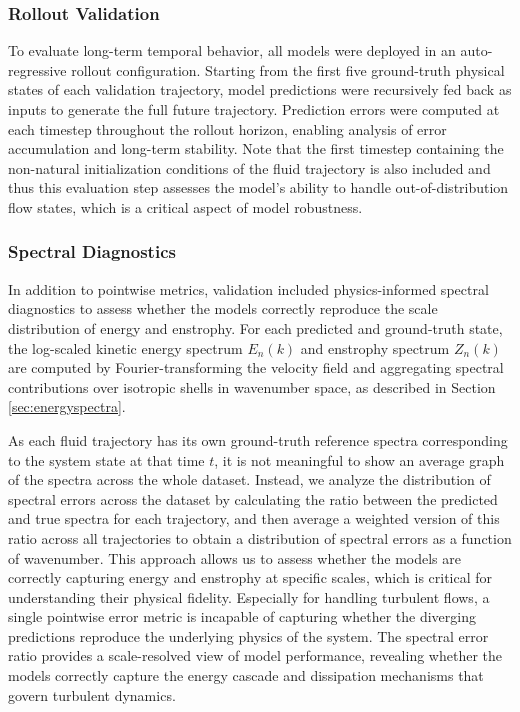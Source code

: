\subsubsection{Rollout Validation}

To evaluate long-term temporal behavior, all models were deployed in an auto-regressive rollout configuration. Starting from the first five ground-truth physical states of each validation trajectory, model predictions were recursively fed back as inputs to generate the full future trajectory. Prediction errors were computed at each timestep throughout the rollout horizon, enabling analysis of error accumulation and long-term stability. Note that the first timestep containing the non-natural initialization conditions of the fluid trajectory is also included and thus this evaluation step assesses the model's ability to handle out-of-distribution flow states, which is a critical aspect of model robustness.

\subsubsection{Spectral Diagnostics}

In addition to pointwise metrics, validation included physics-informed spectral diagnostics to assess whether the models correctly reproduce the scale distribution of energy and enstrophy. For each predicted and ground-truth state, the log-scaled kinetic energy spectrum $E_n(k)$ and enstrophy spectrum $Z_n(k)$ are computed by Fourier-transforming the velocity field and aggregating spectral contributions over isotropic shells in wavenumber space, as described in Section \ref{sec:energyspectra}. 

As each fluid trajectory has its own ground-truth reference spectra corresponding to the system state at that time $t$, it is not meaningful to show an average graph of the spectra across the whole dataset. Instead, we analyze the distribution of spectral errors across the dataset by calculating the ratio between the predicted and true spectra for each trajectory, and then average a weighted version of this ratio across all trajectories to obtain a distribution of spectral errors as a function of wavenumber. This approach allows us to assess whether the models are correctly capturing energy and enstrophy at specific scales, which is critical for understanding their physical fidelity. Especially for handling turbulent flows, a single pointwise error metric is incapable of capturing whether the diverging predictions reproduce the underlying physics of the system. The spectral error ratio provides a scale-resolved view of model performance, revealing whether the models correctly capture the energy cascade and dissipation mechanisms that govern turbulent dynamics. 
\cite{kochkov2021machine}

